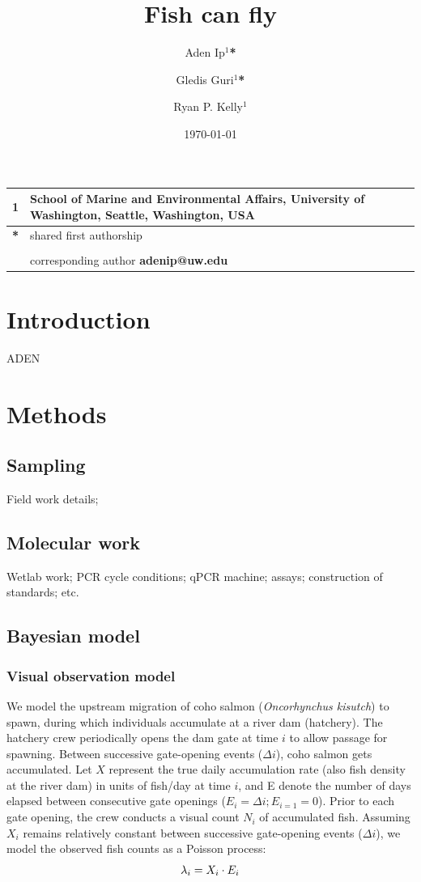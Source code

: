 \documentclass{article}
\title{Fish can fly}
\author{Aden Ip$^1$\textbf{*} \and
Gledis Guri$^1$\textbf{*} \and
Ryan P. Kelly$^1$}
\date{\today}
\begin{document}
\maketitle

\section*{}

\begin{center}
\begin{tabular}{ll}
1 & School of Marine and Environmental Affairs, University of Washington, Seattle, Washington, USA \\
\hline
\textbf{*} & shared first authorship\\
&\\
& corresponding author \textbf{adenip@uw.edu}
\end{tabular}
\end{center}

\section{Introduction}
ADEN
\section{Methods}

\subsection{Sampling}
Field work details;

\subsection{Molecular work}
Wetlab work; PCR cycle conditions; qPCR machine; assays; construction of standards; etc. 


\subsection{Bayesian model}
\subsubsection{Visual observation model}
We model the upstream migration of coho salmon (\textit{Oncorhynchus kisutch}) to spawn, during which individuals accumulate at a river dam (hatchery). The hatchery crew periodically opens the dam gate at time $i$ to allow passage for spawning. Between successive gate-opening events ($\Delta i$), coho salmon gets accumulated. Let $X$ represent the true daily accumulation rate (also fish density at the river dam) in units of fish/day at time $i$, and E denote the number of days elapsed between consecutive gate openings ($ E_i =\Delta i; E_{i=1} = 0$). Prior to each gate opening, the crew conducts a visual count $N_i$ of accumulated fish.
Assuming $X_i$ remains relatively constant between successive gate-opening events ($\Delta i$), we model the observed fish counts as a Poisson process:
\begin{equation}
\lambda_i = X_i \cdot E_i \\
\end{equation}
\end{document}
